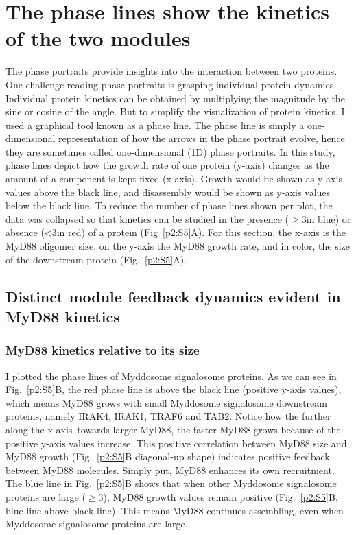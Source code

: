 \section{The phase lines show the kinetics of the two modules}
\label{section:phase_lines}
The phase portraits provide insights into the interaction between two proteins. One challenge reading phase portraits is grasping individual protein dynamics. Individual protein kinetics can be obtained by multiplying the magnitude by the sine or cosine of the angle. But to simplify the visualization of protein kinetics, I used a graphical tool known as a phase line. The phase line is simply a one-dimensional representation of how the arrows in the phase portrait evolve, hence they are sometimes called one-dimensional (1D) phase portraits. In this study, phase lines depict how the growth rate of one protein (y-axis) changes as the amount of a component is kept fixed (x-axis). Growth would be shown as y-axis values above the black line, and disassembly would be shown as y-axis values below the black line. To reduce the number of phase lines shown per plot, the data was collapsed so that kinetics can be studied in the presence ($\geq$3\times in blue) or absence (<3\times in red) of a protein (Fig~\ref{p2:S5}A). For this section, the x-axis is the MyD88 oligomer size, on the y-axis the MyD88 growth rate, and in color, the size of the downstream protein (Fig.~\ref{p2:S5}A). 

\subsection{Distinct module feedback dynamics evident in MyD88 kinetics}

\subsubsection{MyD88 kinetics relative to its size}
I plotted the phase lines of Myddosome signalosome proteins. As we can see in Fig.~\ref{p2:S5}B, the red phase line is above the black line (positive y-axis values), which means MyD88 grows with small Myddosome signalosome downstream proteins, namely IRAK4, IRAK1, TRAF6 and TAB2. Notice how the further along the x-axis--towards larger MyD88, the faster MyD88 grows because of the positive y-axis values increase. This positive correlation between MyD88 size and MyD88 growth (Fig.~\ref{p2:S5}B diagonal-up shape) indicates positive feedback between MyD88 molecules. Simply put, MyD88 enhances its own recruitment. The blue line in Fig.~\ref{p2:S5}B shows that when other Myddosome signalosome proteins are large ($\geq$3\times), MyD88 growth values remain positive (Fig.~\ref{p2:S5}B, blue line above black line). This means MyD88 continues assembling, even when Myddosome signalosome proteins are large.

